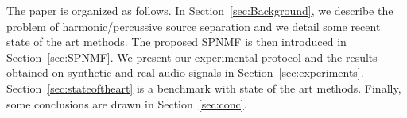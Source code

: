 
The paper is organized as follows. In Section~\ref{sec:Background}, we describe the problem of harmonic/percussive source separation and we detail some recent state of the art methods. The proposed SPNMF is then introduced in Section~\ref{sec:SPNMF}. We present our experimental protocol and the results obtained on synthetic and real audio signals in Section~\ref{sec:experiments}. Section~\ref{sec:stateoftheart} is a benchmark with state of the art methods. Finally, some conclusions are drawn in Section~\ref{sec:conc}.

